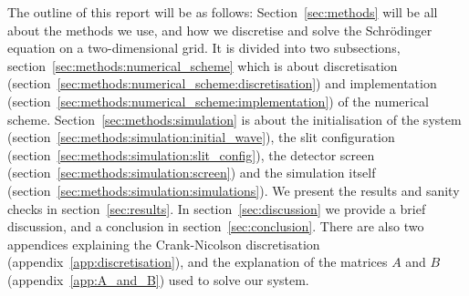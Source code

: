 The outline of this report will be as follows: Section~\ref{sec:methods} will be all about the methods we use, and how we discretise and solve the Schrödinger equation on a two-dimensional grid. It is divided into two subsections, section~\ref{sec:methods:numerical_scheme} which is about discretisation (section~\ref{sec:methods:numerical_scheme:discretisation}) and implementation (section~\ref{sec:methods:numerical_scheme:implementation}) of the numerical scheme. Section~\ref{sec:methods:simulation} is about the initialisation of the system (section~\ref{sec:methods:simulation:initial_wave}), the slit configuration (section~\ref{sec:methods:simulation:slit_config}), the detector screen (section~\ref{sec:methods:simulation:screen}) and the simulation itself (section~\ref{sec:methods:simulation:simulations}). We present the results and sanity checks in section~\ref{sec:results}. In section~\ref{sec:discussion} we provide a brief discussion, and a conclusion in section~\ref{sec:conclusion}. There are also two appendices explaining the Crank-Nicolson discretisation (appendix~\ref{app:discretisation}), and the explanation of the matrices $A$ and $B$ (appendix~\ref{app:A_and_B}) used to solve our system. 



